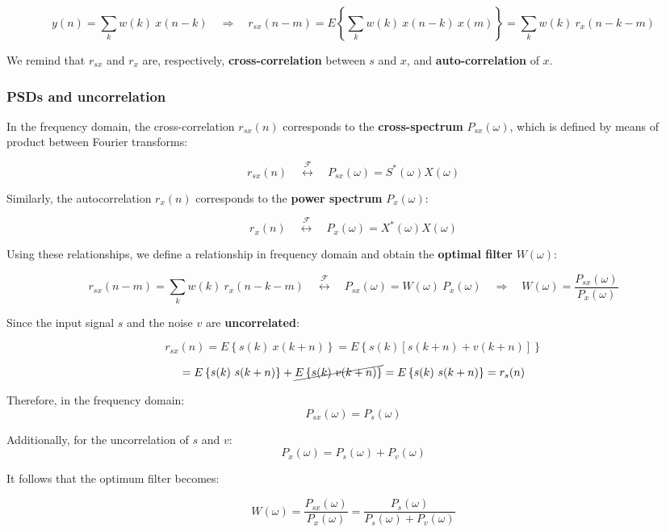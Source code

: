 \[
y(n) = \sum_k w(k) \ x(n-k) \quad \Rightarrow \quad
r_{sx}(n - m) = E \left\{ \sum_k w(k) \ x(n - k) \ x(m) \right\} = \sum_k w(k) \ r_x(n - k - m)
\]

We remind that $r_{sx}$ and $r_x$ are, respectively, \textbf{cross-correlation} between $s$ and $x$, and \textbf{auto-correlation} of $x$.

\subsubsection{PSDs and uncorrelation}

In the frequency domain, the cross-correlation $r_{sx}(n)$ corresponds to the \textbf{cross-spectrum} $P_{sx}(\omega)$, which is defined by means of product between Fourier transforms:

\[
r_{sx}(n) \quad \overset{\mathcal{F}}{\longleftrightarrow} \quad P_{sx}(\omega) = S^*(\omega)X(\omega)
\]

Similarly, the autocorrelation $r_x(n)$ corresponds to the \textbf{power spectrum} $P_x(\omega)$:

\[
r_x(n) \quad \overset{\mathcal{F}}{\longleftrightarrow} \quad P_x(\omega) = X^*(\omega)X(\omega)
\]

Using these relationships, we define a relationship in frequency domain and obtain the \textbf{optimal filter} $W(\omega)$:

\[
r_{sx}(n - m) = \sum_k w(k) \ r_x(n - k - m) \quad \overset{\mathcal{F}}{\longleftrightarrow} \quad
P_{sx}(\omega) = W(\omega) \ P_x(\omega) \quad \Rightarrow \quad
W(\omega) = \frac{P_{sx}(\omega)}{P_x(\omega)}
\]

Since the input signal $s$ and the noise $v$ are \textbf{uncorrelated}:

\[
r_{sx}(n) =  E \left\{ s(k) \ x(k+n) \right\} = E \left\{ s(k) \left[s(k+n) + v(k+n)\right] \right\}
\]

\[
= E \left\{ s(k) \ s(k+n) \right\} + \cancel{E \left\{ s(k) \ v(k+n) \right\}} = E\left\{ s(k) \ s(k+n) \right\} = r_s(n)
\]

Therefore, in the frequency domain:
\[
P_{sx}(\omega) = P_s(\omega)
\]

Additionally, for the uncorrelation of $s$ and $v$:
\[
P_x(\omega) = P_s(\omega) + P_v(\omega)
\]

It follows that the optimum filter becomes:

\[
W(\omega) = \frac{P_{sx}(\omega)}{P_x(\omega)} = \frac{P_s(\omega)}{P_s(\omega) + P_v(\omega)}
\]

